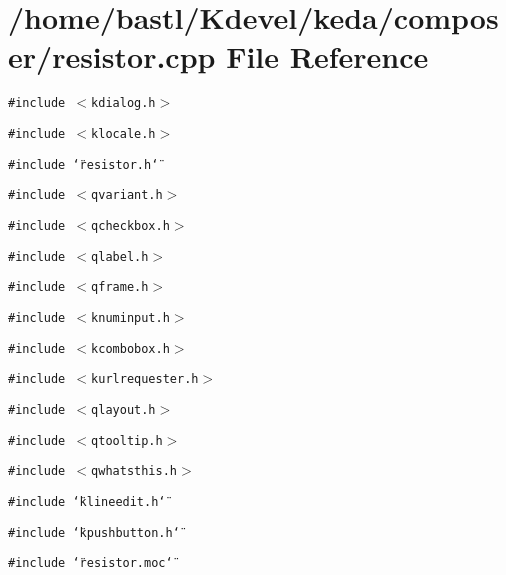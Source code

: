 \section{/home/bastl/Kdevel/keda/composer/resistor.cpp File Reference}
\label{resistor_8cpp}
{\tt \#include $<$kdialog.h$>$}\par
{\tt \#include $<$klocale.h$>$}\par
{\tt \#include \char`\"{}resistor.h\char`\"{}}\par
{\tt \#include $<$qvariant.h$>$}\par
{\tt \#include $<$qcheckbox.h$>$}\par
{\tt \#include $<$qlabel.h$>$}\par
{\tt \#include $<$qframe.h$>$}\par
{\tt \#include $<$knuminput.h$>$}\par
{\tt \#include $<$kcombobox.h$>$}\par
{\tt \#include $<$kurlrequester.h$>$}\par
{\tt \#include $<$qlayout.h$>$}\par
{\tt \#include $<$qtooltip.h$>$}\par
{\tt \#include $<$qwhatsthis.h$>$}\par
{\tt \#include \char`\"{}klineedit.h\char`\"{}}\par
{\tt \#include \char`\"{}kpushbutton.h\char`\"{}}\par
{\tt \#include \char`\"{}resistor.moc\char`\"{}}\par
